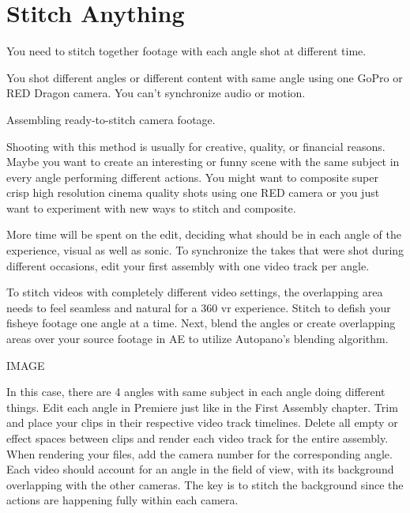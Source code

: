 \chapter{Stitch Anything}
\pagecolor{white}
\label{chap:49}
\begin{fullwidth}

\problem

{\large You need to stitch together footage with each angle shot at different time. \par}

You shot different angles or different content with same angle using one GoPro or RED Dragon camera. You can’t synchronize audio or motion. 

\solution

{\large Assembling ready-to-stitch camera footage. \par}

Shooting with this method is usually for creative, quality, or financial reasons. Maybe you want to create an interesting or funny scene with the same subject in every angle performing different actions. You might want to composite super crisp high resolution cinema quality shots using one RED camera or you just want to experiment with new ways to stitch and composite.

More time will be spent on the edit, deciding what should be in each angle of the experience, visual as well as sonic. To synchronize the takes that were shot during different occasions, edit your first assembly with one video track per angle. 

To stitch videos with completely different video settings, the overlapping area needs to feel seamless and natural  for a 360 vr experience. Stitch to defish your fisheye footage one angle at a time. Next, blend the angles or create overlapping areas over your source footage in AE to utilize Autopano’s blending algorithm.

IMAGE

In this case, there are 4 angles with same subject in each angle doing different things. Edit each angle in Premiere just like in the First Assembly chapter. Trim and place your clips in their respective video track timelines. Delete all empty or effect spaces between clips and render each video track for the entire assembly. When rendering your files, add the camera number for the corresponding angle. Each video should account for an angle in the field of view, with its background overlapping with the other cameras. The key is to stitch the background since the actions are happening fully within each camera. 


\clearpage
\end{fullwidth}